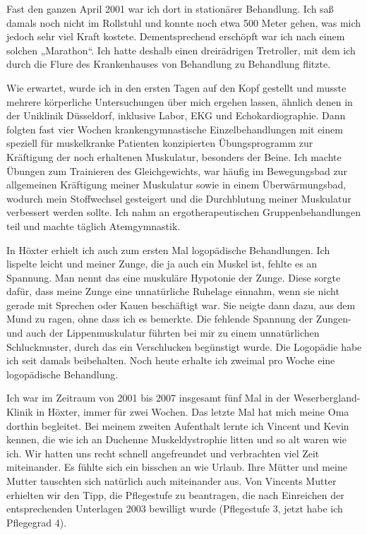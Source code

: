 \documentclass[fontsize=14pt,a4paper,headinclude,DIV=calc,automark]{scrbook}
\begin{document}
Fast den ganzen April 2001 war ich dort in stationärer Behandlung. Ich saß damals noch nicht im Rollstuhl und konnte noch etwa 500 Meter gehen, was mich jedoch sehr viel Kraft kostete. Dementsprechend erschöpft war ich nach einem solchen „Marathon“. Ich hatte deshalb einen dreirädrigen Tretroller, mit dem ich durch die Flure des Krankenhauses von Behandlung zu Behandlung flitzte.

Wie erwartet, wurde ich in den ersten Tagen auf den Kopf gestellt und musste mehrere körperliche Untersuchungen über mich ergehen lassen, ähnlich denen in der Uniklinik Düsseldorf, inklusive Labor, EKG und Echokardiographie. Dann folgten fast vier Wochen krankengymnastische Einzelbehandlungen mit einem speziell für muskelkranke Patienten konzipierten Übungsprogramm zur Kräftigung der noch erhaltenen Muskulatur, besonders der Beine. Ich machte Übungen zum Trainieren des Gleichgewichts, war häufig im Bewegungsbad zur allgemeinen Kräftigung meiner Muskulatur sowie in einem Überwärmungsbad, wodurch mein Stoffwechsel gesteigert und die Durchblutung meiner Muskulatur verbessert werden sollte. Ich nahm an ergotherapeutischen Gruppenbehandlungen teil und machte täglich Atemgymnastik.

In Höxter erhielt ich auch zum ersten Mal logopädische Behandlungen. Ich lispelte leicht und meiner Zunge, die ja auch ein Muskel ist, fehlte es an Spannung. Man nennt das eine muskuläre Hypotonie der Zunge. Diese sorgte dafür, dass meine Zunge eine unnatürliche Ruhelage einnahm, wenn sie nicht gerade mit Sprechen oder Kauen beschäftigt war. Sie neigte dann dazu, aus dem Mund zu ragen, ohne dass ich es bemerkte. Die fehlende Spannung der Zungen- und auch der Lippenmuskulatur führten bei mir zu einem unnatürlichen Schluckmuster, durch das ein Verschlucken begünstigt wurde. Die Logopädie habe ich seit damals beibehalten. Noch heute erhalte ich zweimal pro Woche eine logopädische Behandlung.

Ich war im Zeitraum von 2001 bis 2007 insgesamt fünf Mal in der We\-ser\-berg\-land-Klinik in Höxter, immer für zwei Wochen. Das letzte Mal hat mich meine Oma dorthin begleitet. Bei meinem zweiten Aufenthalt lernte ich Vincent und Kevin kennen, die wie ich an Duchenne Muskeldystrophie litten und so alt waren wie ich. Wir hatten uns recht schnell angefreundet und verbrachten viel Zeit miteinander. Es fühlte sich ein bisschen an wie Urlaub. Ihre Mütter und meine Mutter tauschten sich natürlich auch miteinander aus. Von Vincents Mutter erhielten wir den Tipp, die Pflegestufe zu beantragen, die nach Einreichen der entsprechenden Unterlagen 2003 bewilligt wurde (Pflegestufe 3, jetzt habe ich Pflegegrad 4).
\end{document}
